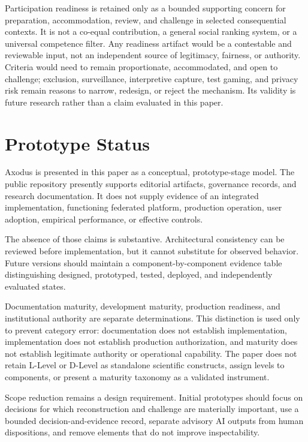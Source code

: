\documentclass[11pt]{article}
\begin{document}
Participation readiness is retained only as a bounded supporting concern for
preparation, accommodation, review, and challenge in selected consequential
contexts. It is not a co-equal contribution, a general social ranking system,
or a universal competence filter. Any readiness artifact would be a
contestable and reviewable input, not an independent source of legitimacy,
fairness, or authority. Criteria would need to remain proportionate,
accommodated, and open to challenge; exclusion, surveillance, interpretive
capture, test gaming, and privacy risk remain reasons to narrow, redesign, or
reject the mechanism. Its validity is future research rather than a claim
evaluated in this paper.

\section{Prototype Status}

Axodus is presented in this paper as a conceptual, prototype-stage model. The
public repository presently supports editorial artifacts, governance records,
and research documentation. It does not supply evidence of an integrated
implementation, functioning federated platform, production operation, user
adoption, empirical performance, or effective controls.

The absence of those claims is substantive. Architectural consistency can be
reviewed before implementation, but it cannot substitute for observed
behavior. Future versions should maintain a component-by-component evidence
table distinguishing designed, prototyped, tested, deployed, and
independently evaluated states.

Documentation maturity, development maturity, production readiness, and
institutional authority are separate determinations. This distinction is used
only to prevent category error: documentation does not establish
implementation, implementation does not establish production authorization,
and maturity does not establish legitimate authority or operational
capability. The paper does not retain L-Level or D-Level as standalone
scientific constructs, assign levels to components, or present a maturity
taxonomy as a validated instrument.

Scope reduction remains a design requirement. Initial prototypes should focus
on decisions for which reconstruction and challenge are materially important,
use a bounded decision-and-evidence record, separate advisory AI outputs from
human dispositions, and remove elements that do not improve inspectability.
\end{document}
